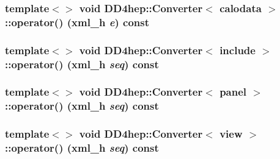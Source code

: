\label{struct_d_d4hep_1_1_converter_a8dc46a004a139a5a5d924fea83230135}
\hypertarget{struct_d_d4hep_1_1_converter_aea99ac077bd50a1b4fe352613b32ae2e}{
\subsubsection[{operator()}]{\setlength{\rightskip}{0pt plus 5cm}template$<$$>$ void {\bf DD4hep::Converter}$<$ calodata $>$::operator() ({\bf xml\_\-h} {\em e}) const}}
\label{struct_d_d4hep_1_1_converter_aea99ac077bd50a1b4fe352613b32ae2e}
\hypertarget{struct_d_d4hep_1_1_converter_a5b13161e909e467c6cf9435b2c97315a}{
\subsubsection[{operator()}]{\setlength{\rightskip}{0pt plus 5cm}template$<$$>$ void {\bf DD4hep::Converter}$<$ include $>$::operator() ({\bf xml\_\-h} {\em seq}) const}}
\label{struct_d_d4hep_1_1_converter_a5b13161e909e467c6cf9435b2c97315a}
\hypertarget{struct_d_d4hep_1_1_converter_a3c464e986d3bc99e23f348beb950cf27}{
\subsubsection[{operator()}]{\setlength{\rightskip}{0pt plus 5cm}template$<$$>$ void {\bf DD4hep::Converter}$<$ panel $>$::operator() ({\bf xml\_\-h} {\em seq}) const}}
\label{struct_d_d4hep_1_1_converter_a3c464e986d3bc99e23f348beb950cf27}
\hypertarget{struct_d_d4hep_1_1_converter_aaa0f45df01957c77b7b5736c1b1c6269}{
\subsubsection[{operator()}]{\setlength{\rightskip}{0pt plus 5cm}template$<$$>$ void {\bf DD4hep::Converter}$<$ view $>$::operator() ({\bf xml\_\-h} {\em seq}) const}}
